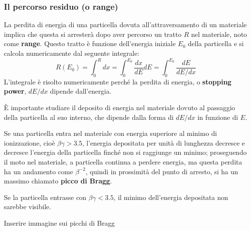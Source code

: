 \documentclass[10pt, a4paper]{scrartcl}
\numberwithin{equation}{subsection}
\theoremstyle{style1}
\newenvironment{boxenv}[1][]{
    \begin{eqbox}[#1]
    }{
   \end{eqbox}
}
\begin{document}
\subsubsection{Il percorso residuo (o range)}
La perdita di energia di una particella dovuta all'attraversamento di un materiale implica che questa si arrester\`a dopo aver percorso un tratto $R$ nel materiale, noto come \textbf{range}. Questo tratto \`e funzione dell'energia iniziale $E_0$ della particella e si calcola numericamente dal seguente integrale:
\begin{equation}
	R(E_0)  = \int_{0} ^R dx = \int_{0} ^{E_0} \frac{d x}{d E} dE	= \int_{0} ^{E_0}  \frac{dE}{dE / dx}
\end{equation}
L'integrale \`e risolto numericamente perch\'e la perdita di energia, o \textbf{stopping power}, $dE / dx $ dipende dall'energia.

\`E importante studiare il deposito di energia nel materiale dovuto al passaggio della particella al suo interno, che dipende dalla forma di $dE / dx$ in funzione di $E$.

Se una particella entra nel materiale con energia superiore al minimo di ionizzazione, cio\`e $\beta  \gamma > 3.5$, l'energia depositata per unit\`a di lunghezza decresce e decresce l'energia della particella finch\'e non si raggiunge un minimo; proseguendo il moto nel materiale, a particella continua a perdere energia, ma questa perdita ha un andamento come $\beta ^{-2} $, quindi in prossimit\`a del punto di arresto, si ha un massimo chiamato \textbf{picco di Bragg}.

Se la particella entrasse con $\beta \gamma < 3.5$, il minimo dell'energia depositata non sarebbe visibile.
\begin{boxenv}[]
	\centering \color{red} Inserire immagine sui picchi di Bragg
\end{boxenv}
\end{document}
